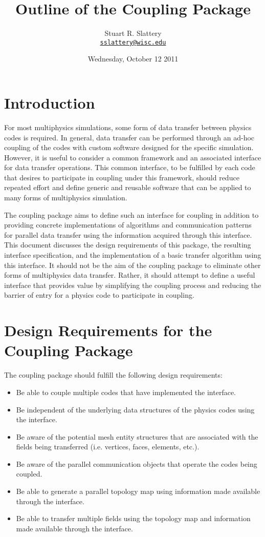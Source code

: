 \documentclass[letterpaper]{article}
\author{Stuart R. Slattery
\\ \href{mailto:sslattery@wisc.edu}{\texttt{sslattery@wisc.edu}}
}
\date{Wednesday, October 12 2011}
\title{Outline of the Coupling Package}
\begin{document}
\maketitle

\section{Introduction}
For most multiphysics simulations, some form of data transfer between
physics codes is required. In general, data transfer can be performed
through an ad-hoc coupling of the codes with custom software designed
for the specific simulation. However, it is useful to consider a
common framework and an associated interface for data transfer
operations. This common interface, to be fulfilled by each code that
desires to participate in coupling under this framework, should reduce
repeated effort and define generic and reusable software that can be
applied to many forms of multiphysics simulation.

The coupling package aims to define such an interface for coupling in
addition to providing concrete implementations of algorithms and
communication patterns for parallel data transfer using the
information acquired through this interface. This document discusses
the design requirements of this package, the resulting interface
specification, and the implementation of a basic transfer algorithm
using this interface. It should not be the aim of the coupling package
to eliminate other forms of multiphysics data transfer. Rather, it
should attempt to define a useful interface that provides value by
simplifying the coupling process and reducing the barrier of entry for
a physics code to participate in coupling. 

\section{Design Requirements for the Coupling Package}
The coupling package should fulfill the following design
requirements:

\begin{itemize}
\item Be able to couple multiple codes that have implemented the
  interface.
\item Be independent of the underlying data structures of the physics
  codes using the interface.
\item Be aware of the potential mesh entity structures that are
  associated with the fields being transferred (i.e. vertices, faces,
  elements, etc.).
\item Be aware of the parallel communication objects that operate the
  codes being coupled.
\item Be able to generate a parallel topology map using information
  made available through the interface.
\item Be able to transfer multiple fields using the topology map and
  information made available through the interface.
\end{itemize}
\end{document}

